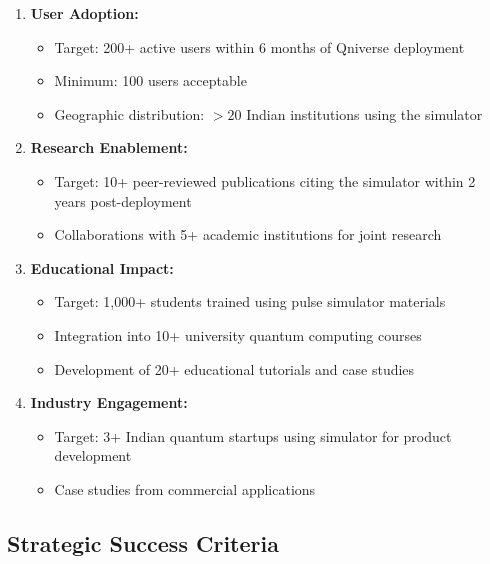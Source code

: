 \documentclass[12pt,a4paper]{article}
\begin{document}
\begin{enumerate}[noitemsep]
\item \textbf{User Adoption:}
   \begin{itemize}[noitemsep]
   \item Target: 200+ active users within 6 months of Qniverse deployment
   \item Minimum: 100 users acceptable
   \item Geographic distribution: $>20$ Indian institutions using the simulator
   \end{itemize}

\item \textbf{Research Enablement:}
   \begin{itemize}[noitemsep]
   \item Target: 10+ peer-reviewed publications citing the simulator within 2 years post-deployment
   \item Collaborations with 5+ academic institutions for joint research
   \end{itemize}

\item \textbf{Educational Impact:}
   \begin{itemize}[noitemsep]
   \item Target: 1,000+ students trained using pulse simulator materials
   \item Integration into 10+ university quantum computing courses
   \item Development of 20+ educational tutorials and case studies
   \end{itemize}

\item \textbf{Industry Engagement:}
   \begin{itemize}[noitemsep]
   \item Target: 3+ Indian quantum startups using simulator for product development
   \item Case studies from commercial applications
   \end{itemize}
\end{enumerate}

\subsection{Strategic Success Criteria}
\end{document}
